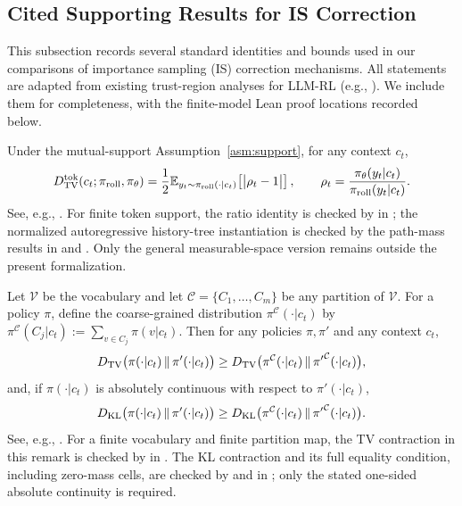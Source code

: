 \subsection{Cited Supporting Results for IS Correction}
\label{sec:cited-is-results}

This subsection records several standard identities and bounds used in our comparisons of importance sampling (IS) correction mechanisms.
All statements are adapted from existing trust-region analyses for LLM-RL (e.g., \citet{qi2026rethinkingtrustregionllm,li2025trm}). We
include them for completeness, with the finite-model Lean proof locations recorded below.

\begin{remark}
\label{rem:tv-ratio-identity}
Under the mutual-support Assumption~\ref{asm:support}, for any context $c_t$,
\begin{equation*}
    D_{\mathrm{TV}}^{\mathrm{tok}}(c_t;\pi_{\mathrm{roll}},\pi_{\theta})
    = \frac{1}{2}\mathbb{E}_{y_t \sim \pi_{\mathrm{roll}}(\cdot|c_t)}\!\left[\big|\rho_t - 1\big|\right],
    \qquad
    \rho_t = \frac{\pi_{\theta}(y_t|c_t)}{\pi_{\mathrm{roll}}(y_t|c_t)}.
\end{equation*}
See, e.g., \citet{qi2026rethinkingtrustregionllm}.
For finite token support, the ratio identity is checked by
 in
; the normalized autoregressive history-tree
instantiation is checked by the path-mass results in
 and .
Only the general measurable-space version remains outside the present
formalization.
\end{remark}

\begin{remark}
\label{rem:coarse-grain-lower}
Let $\mathcal{V}$ be the vocabulary and let $\mathcal{C}=\{C_1,\ldots,C_m\}$ be any partition of $\mathcal{V}$. For a policy $\pi$,
define the coarse-grained distribution $\pi^{\mathcal{C}}(\cdot|c_t)$ by $\pi^{\mathcal{C}}(C_j|c_t):=\sum_{v\in C_j}\pi(v|c_t)$.
Then for any policies $\pi,\pi'$ and any context $c_t$,
\begin{equation*}
    D_{\mathrm{TV}}\big(\pi(\cdot|c_t)\,\|\,\pi'(\cdot|c_t)\big)
    \ge D_{\mathrm{TV}}\big(\pi^{\mathcal{C}}(\cdot|c_t)\,\|\,{\pi'}^{\mathcal{C}}(\cdot|c_t)\big),
\end{equation*}
and, if $\pi(\cdot|c_t)$ is absolutely continuous with respect to $\pi'(\cdot|c_t)$,
\begin{equation*}
    D_{\mathrm{KL}}\big(\pi(\cdot|c_t)\,\|\,\pi'(\cdot|c_t)\big)
    \ge D_{\mathrm{KL}}\big(\pi^{\mathcal{C}}(\cdot|c_t)\,\|\,{\pi'}^{\mathcal{C}}(\cdot|c_t)\big).
\end{equation*}
See, e.g., \citet{qi2026rethinkingtrustregionllm}.
For a finite vocabulary and finite partition map, the TV contraction in this
remark is checked by
 in
. The KL contraction and its full equality
condition, including zero-mass cells, are checked by
 and
 in
; only the stated one-sided absolute continuity is required.
\end{remark}

